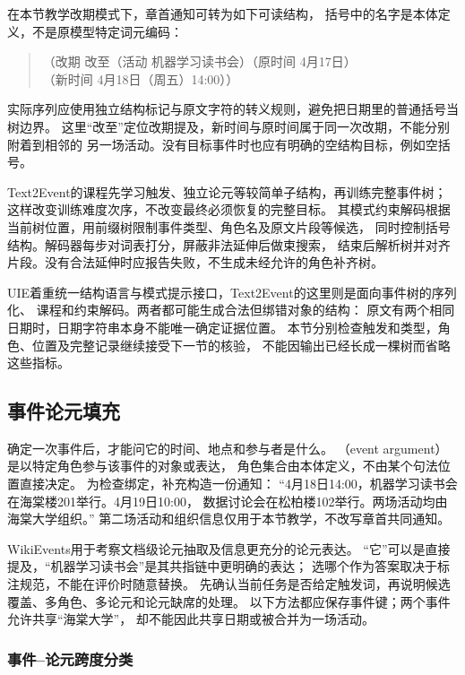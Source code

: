 在本节教学改期模式下，章首通知可转为如下可读结构，
括号中的名字是本体定义，不是原模型特定词元编码：
\begin{quote}
（改期 改至（活动 机器学习读书会）（原时间 4月17日）\\
（新时间 4月18日（周五）14:00））
\end{quote}
实际序列应使用独立结构标记与原文字符的转义规则，避免把日期里的普通括号当树边界。
这里“改至”定位改期提及，新时间与原时间属于同一次改期，不能分别附着到相邻的
另一场活动。没有目标事件时也应有明确的空结构目标，例如空括号。

Text2Event的课程先学习触发、独立论元等较简单子结构，再训练完整事件树；
这样改变训练难度次序，不改变最终必须恢复的完整目标。
其模式约束解码根据当前树位置，用前缀树限制事件类型、角色名及原文片段等候选，
同时控制括号结构。解码器每步对词表打分，屏蔽非法延伸后做束搜索，
结束后解析树并对齐片段。没有合法延伸时应报告失败，不生成未经允许的角色补齐树。

UIE着重统一结构语言与模式提示接口，Text2Event的这里则是面向事件树的序列化、
课程和约束解码。两者都可能生成合法但绑错对象的结构：
原文有两个相同日期时，日期字符串本身不能唯一确定证据位置。
本节分别检查触发和类型，角色、位置及完整记录继续接受下一节的核验，
不能因输出已经长成一棵树而省略这些指标。

\subsection{事件论元填充}
\label{sec:nlp-extraction-arguments}

确定一次事件后，才能问它的时间、地点和参与者是什么。
（event argument）是以特定角色参与该事件的对象或表达，
角色集合由本体定义，不由某个句法位置直接决定。
为检查绑定，补充构造一份通知：
“4月18日14:00，机器学习读书会在海棠楼201举行。4月19日10:00，
数据讨论会在松柏楼102举行。两场活动均由海棠大学组织。”
第二场活动和组织信息仅用于本节教学，不改写章首共同通知。

WikiEvents用于考察文档级论元抽取及信息更充分的论元表达。
“它”可以是直接提及，“机器学习读书会”是其共指链中更明确的表达；
选哪个作为答案取决于标注规范，不能在评价时随意替换。
先确认当前任务是否给定触发词，再说明候选覆盖、多角色、多论元和论元缺席的处理。
以下方法都应保存事件键；两个事件允许共享“海棠大学”，
却不能因此共享日期或被合并为一场活动。

\subsubsection{事件--论元跨度分类}
\label{sec:nlp-extraction-argument-spans}

